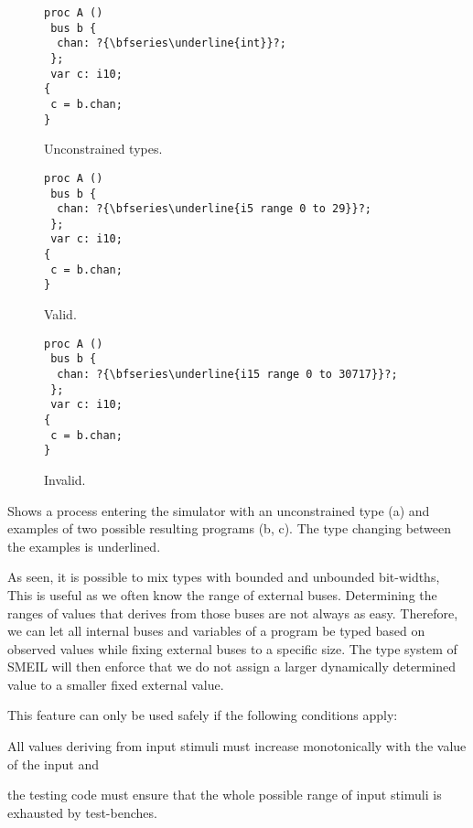 \begin{widefigure}
  \centering
  \begin{subfigure}[t]{0.30\linewidth}
\begin{lstlisting}[language=smeil]
proc A ()
 bus b {
  chan: ?{\bfseries\underline{int}}?;
 };
 var c: i10;
{
 c = b.chan;
}
\end{lstlisting}
    \caption{Unconstrained types.}
    \label{fig:oktype}
  \end{subfigure}
  \begin{subfigure}[t]{0.30\linewidth}
    \begin{lstlisting}[language=smeil]
proc A ()
 bus b {
  chan: ?{\bfseries\underline{i5 range 0 to 29}}?;
 };
 var c: i10;
{
 c = b.chan;
}
    \end{lstlisting}
    \caption{Valid.}
    \label{fig:non-violated}
  \end{subfigure}
  \begin{subfigure}[t]{0.30\linewidth}
    \begin{lstlisting}[language=smeil]
proc A ()
 bus b {
  chan: ?{\bfseries\underline{i15 range 0 to 30717}}?;
 };
 var c: i10;
{
 c = b.chan;
}
\end{lstlisting}
    \caption{Invalid.}
    \label{fig:violated}
  \end{subfigure}
  \caption{Shows a process entering the simulator with an unconstrained type (a)
    and examples of two possible resulting programs (b, c). The type changing
    between the examples is underlined.}
  \label{fig:simtyping}
\end{widefigure}

As seen, it is possible to mix types with bounded and unbounded bit-widths, This
is useful as we often know the range of external buses. Determining the
ranges of values that derives from those buses are not always as
easy. Therefore, we can let all internal buses and variables of a program be
typed based on observed values while fixing external buses to a specific
size. The type system of SMEIL will then enforce that we do not assign a larger
dynamically determined value to a smaller fixed external value.

This feature can only be used safely if the following conditions
apply: \begin{inparaenum}[1)] \item All values deriving from input stimuli must
  increase monotonically with the value of the input and \item the testing code
  must ensure that the whole possible range of input stimuli is exhausted by
  test-benches.
\end{inparaenum}

